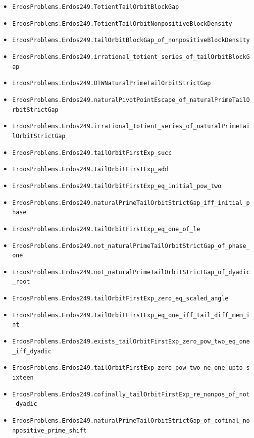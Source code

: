 \begin{itemize}
  \item \nolinkurl{ErdosProblems.Erdos249.TotientTailOrbitBlockGap}
  \item \nolinkurl{ErdosProblems.Erdos249.TotientTailOrbitNonpositiveBlockDensity}
  \item \nolinkurl{ErdosProblems.Erdos249.tailOrbitBlockGap_of_nonpositiveBlockDensity}
  \item \nolinkurl{ErdosProblems.Erdos249.irrational_totient_series_of_tailOrbitBlockGap}
  \item \nolinkurl{ErdosProblems.Erdos249.DTWNaturalPrimeTailOrbitStrictGap}
  \item \nolinkurl{ErdosProblems.Erdos249.naturalPivotPointEscape_of_naturalPrimeTailOrbitStrictGap}
  \item \nolinkurl{ErdosProblems.Erdos249.irrational_totient_series_of_naturalPrimeTailOrbitStrictGap}
  \item \nolinkurl{ErdosProblems.Erdos249.tailOrbitFirstExp_succ}
  \item \nolinkurl{ErdosProblems.Erdos249.tailOrbitFirstExp_add}
  \item \nolinkurl{ErdosProblems.Erdos249.tailOrbitFirstExp_eq_initial_pow_two}
  \item \nolinkurl{ErdosProblems.Erdos249.naturalPrimeTailOrbitStrictGap_iff_initial_phase}
  \item \nolinkurl{ErdosProblems.Erdos249.tailOrbitFirstExp_eq_one_of_le}
  \item \nolinkurl{ErdosProblems.Erdos249.not_naturalPrimeTailOrbitStrictGap_of_phase_one}
  \item \nolinkurl{ErdosProblems.Erdos249.not_naturalPrimeTailOrbitStrictGap_of_dyadic_root}
  \item \nolinkurl{ErdosProblems.Erdos249.tailOrbitFirstExp_zero_eq_scaled_angle}
  \item \nolinkurl{ErdosProblems.Erdos249.tailOrbitFirstExp_eq_one_iff_tail_diff_mem_int}
  \item \nolinkurl{ErdosProblems.Erdos249.exists_tailOrbitFirstExp_zero_pow_two_eq_one_iff_dyadic}
  \item \nolinkurl{ErdosProblems.Erdos249.tailOrbitFirstExp_zero_pow_two_ne_one_upto_sixteen}
  \item \nolinkurl{ErdosProblems.Erdos249.cofinally_tailOrbitFirstExp_re_nonpos_of_not_dyadic}
  \item \nolinkurl{ErdosProblems.Erdos249.naturalPrimeTailOrbitStrictGap_of_cofinal_nonpositive_prime_shift}
\end{itemize}

